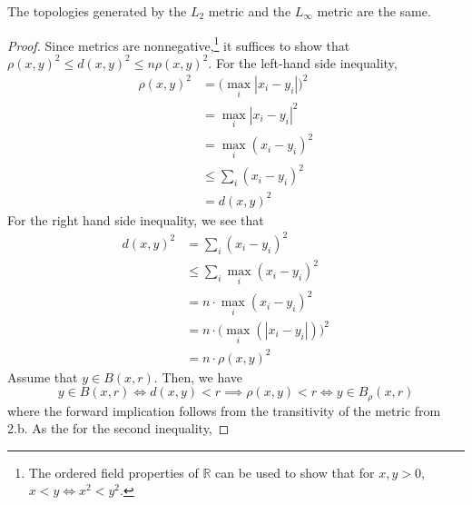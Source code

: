 \documentclass{article}
\begin{document}
      \begin{theorem} 
        The topologies generated by the $L_2$ metric and the $L_\infty$ metric are the same. 
      \end{theorem} 
      \begin{proof}
        Since metrics are nonnegative,\footnote{The ordered field properties of $\mathbb{R}$ can be used to show that for $x, y > 0$, $x < y \iff x^2 < y^2$.} it suffices to show that $\rho(x, y)^2 \leq d(x, y)^2 \leq n \rho (x, y)^2$. For the left-hand side inequality, 
        \begin{align}
          \rho(x, y)^2 & = \big( \max_i |x_i - y_i| \big)^2 && \tag{definition of $L_\infty$ metric}\\
                       & = \max_i | x_i - y_i|^2 && \tag{can move square inside since $|x_i - y_i| > 0$ for all $i$}\\
                       & = \max_i (x_i - y_i)^2 && \tag{absolute value is irrlevant if we are squaring it}\\
                       & \leq \sum_i (x_i - y_i)^2 && \tag{sum contains the max with all nonnegative elements}\\
                       & = d(x, y)^2 && \tag{definition of $L_2$ metric}
        \end{align}
        For the right hand side inequality, we see that 
        \begin{align}
          d(x, y)^2 & = \sum_i (x_i - y_i)^2 && \tag{definition of $L_2$ metric}\\
                    & \leq \sum_i \max_i ( x_i - y_i)^2 && \tag{bound each element by the max of the elements}\\
                    & = n \cdot \max_i (x_i - y_i)^2 && \tag{since it's a sum of constant elements}\\
                    & = n \cdot \big( \max_i (|x_i - y_i|)\big)^2 && \tag{equivalent by previous logic}\\
                    & = n \cdot \rho(x, y)^2 && \tag{definition of $L_\infty$ norm}
        \end{align}
        Assume that $y \in B(x, r)$. Then, we have 
        \begin{equation}
          y \in B(x, r) \iff d(x, y) < r \implies \rho(x, y) < r \iff y \in B_\rho (x, r) 
        \end{equation}
        where the forward implication follows from the transitivity of the metric from 2.b. As the for the second inequality, 

\end{proof}
\end{document}
